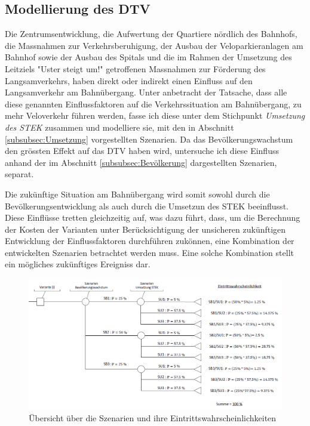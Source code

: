 	\subsection{Modellierung des DTV}
	\label{subsec:Modellierung}
	
Die Zentrumsentwicklung, die Aufwertung der Quartiere nördlich des Bahnhofs, die Massnahmen zur Verkehrsberuhigung, der Ausbau der Veloparkieranlagen am Bahnhof sowie der Ausbau des Spitals und die im Rahmen der Umsetzung des Leitziels "Uster steigt um!" getroffenen Massnahmen zur Förderung des Langsamverkehrs, haben direkt oder indirekt einen Einfluss auf den Langsamverkehr am Bahnübergang. Unter anbetracht der Tatsache, dass alle diese genannten Einflussfaktoren auf die Verkehrssituation am Bahnübergang, zu mehr Veloverkehr führen werden, fasse ich diese unter dem Stichpunkt \textit{Umsetzung des STEK} zusammen und modelliere sie, mit den in Abschnitt \ref{subsubsec:Umsetzung} vorgestellten Szenarien. Da das Bevölkerungswachstum den grössten Effekt auf das DTV haben wird, untersuche ich diese Einfluss anhand der im Abschnitt \ref{subsubsec:Bevölkerung} dargestellten Szenarien, separat. 

Die zukünftige Situation am Bahnübergang wird somit sowohl durch die Bevölkerungsentwicklung als auch durch die Umsetzun des STEK beeinflusst. Diese Einflüsse tretten gleichzeitig auf, was dazu führt, dass, um die Berechnung der Kosten der Varianten unter Berücksichtigung der unsicheren zukünftigen Entwicklung der Einflussfaktoren durchführen zukönnen, eine Kombination der entwickelten Szenarien betrachtet werden muss. Eine solche Kombination stellt ein mögliches zukünftiges Ereigniss dar. 

\begin{figure}[h!]
	\centering
	\includegraphics[width=\textwidth]{figures/f-04-06-01-Entscheidungsbaum-Szenarien}
	\caption[Szenarienübersicht]{Übersicht über die Szenarien und ihre Eintrittswahrscheinlichkeiten}
	\label{img:EntscheidunSzenarien}
\end{figure}

